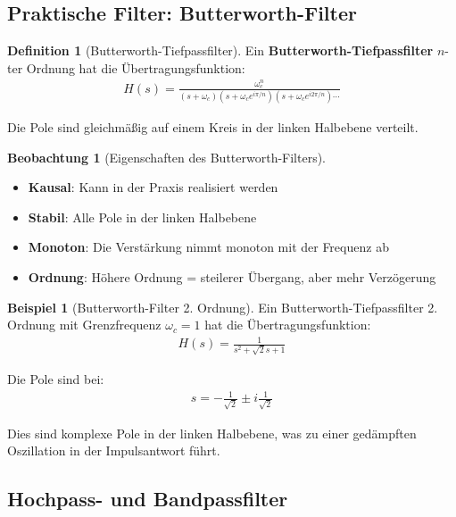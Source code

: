 ﻿\documentclass[a4paper,12pt]{report}
\theoremstyle{definition}
\newtheorem{definition}{Definition}
\newtheorem{beispiel}{Beispiel}
\newtheorem{beobachtung}{Beobachtung}
\begin{document}
	\subsection{Praktische Filter: Butterworth-Filter}
	
	\begin{definition}[Butterworth-Tiefpassfilter]
		Ein \textbf{Butterworth-Tiefpassfilter} $n$-ter Ordnung hat die Übertragungsfunktion:
		\begin{align}
			H(s) = \frac{\omega_c^n}{(s + \omega_c)(s + \omega_c e^{i\pi/n})(s + \omega_c e^{i2\pi/n}) \cdots}
		\end{align}
		
		Die Pole sind gleichmäßig auf einem Kreis in der linken Halbebene verteilt.
	\end{definition}
	
	\begin{beobachtung}[Eigenschaften des Butterworth-Filters]
		\begin{itemize}
			\item[-] \textbf{Kausal}: Kann in der Praxis realisiert werden
			\item[-] \textbf{Stabil}: Alle Pole in der linken Halbebene
			\item[-] \textbf{Monoton}: Die Verstärkung nimmt monoton mit der Frequenz ab
			\item[-] \textbf{Ordnung}: Höhere Ordnung = steilerer Übergang, aber mehr Verzögerung
		\end{itemize}
	\end{beobachtung}
	
	\begin{beispiel}[Butterworth-Filter 2. Ordnung]
		Ein Butterworth-Tiefpassfilter 2. Ordnung mit Grenzfrequenz $\omega_c = 1$ hat die Übertragungsfunktion:
		\begin{align}
			H(s) = \frac{1}{s^2 + \sqrt{2} s + 1}
		\end{align}
		
		Die Pole sind bei:
		\begin{align}
			s = -\frac{1}{\sqrt{2}} \pm i\frac{1}{\sqrt{2}}
		\end{align}
		
		Dies sind komplexe Pole in der linken Halbebene, was zu einer gedämpften Oszillation in der Impulsantwort führt.
	\end{beispiel}
	
	\subsection{Hochpass- und Bandpassfilter}
	
\end{document}
